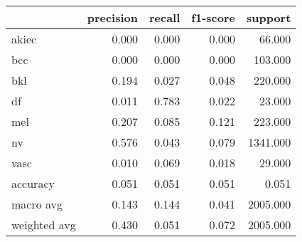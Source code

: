 \begin{tabular}{lrrrr}
\toprule
 & precision & recall & f1-score & support \\
\midrule
akiec & 0.000 & 0.000 & 0.000 & 66.000 \\
bcc & 0.000 & 0.000 & 0.000 & 103.000 \\
bkl & 0.194 & 0.027 & 0.048 & 220.000 \\
df & 0.011 & 0.783 & 0.022 & 23.000 \\
mel & 0.207 & 0.085 & 0.121 & 223.000 \\
nv & 0.576 & 0.043 & 0.079 & 1341.000 \\
vasc & 0.010 & 0.069 & 0.018 & 29.000 \\
accuracy & 0.051 & 0.051 & 0.051 & 0.051 \\
macro avg & 0.143 & 0.144 & 0.041 & 2005.000 \\
weighted avg & 0.430 & 0.051 & 0.072 & 2005.000 \\
\bottomrule
\end{tabular}
